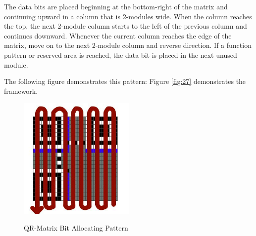 The data bits are placed beginning at the bottom-right of the matrix and continuing upward in a column that is 2-modules wide. When the column reaches the top, the next 2-module column starts to the left of the previous column and continues downward. Whenever the current column reaches the edge of the matrix, move on to the next 2-module column and reverse direction. If a function pattern or reserved area is reached, the data bit is placed in the next unused module.

The following figure demonstrates this pattern:
Figure \ref{fig:27} demonstrates the framework.
\begin{figure}[H]
  \caption{QR-Matrix Bit Allocating Pattern\cite{Thonky}}
  \centering
    \includegraphics[width=0.5\textwidth]{figures/Feeding.jpg}
    \label{fig:28}
\end{figure}

